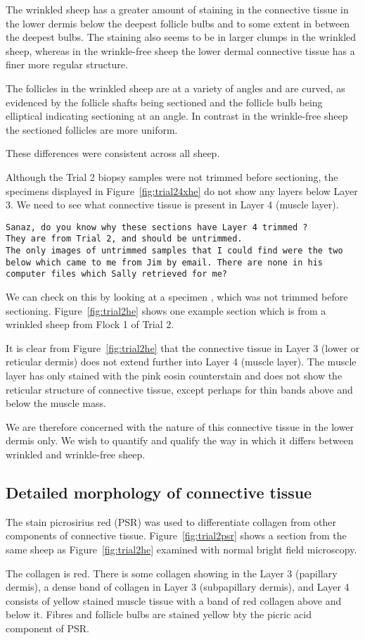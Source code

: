 \documentclass[titlepage]{article}  %
\begin{document}
The wrinkled sheep has a greater amount of staining in the  connective tissue in the lower dermis below the deepest follicle bulbs and to some extent in between the deepest bulbs. The staining also seems to be in larger clumps in the wrinkled sheep, whereas in the wrinkle-free sheep the lower dermal connective tissue has a finer more regular structure. 

  The follicles in the wrinkled sheep are at a variety of angles and are curved, as evidenced by the follicle shafts being sectioned and the follicle bulb being elliptical indicating sectioning at an angle. In contrast in the wrinkle-free sheep the sectioned follicles are more uniform. 

These differences were consistent across all sheep.

Although the Trial 2 biopsy samples were not trimmed before sectioning, the specimens displayed in Figure~\ref{fig:trial24xhe} do not show any layers below Layer 3. We need to see what connective tissue is present in Layer 4 (muscle layer). 
\begin{verbatim}
Sanaz, do you know why these sections have Layer 4 trimmed ? 
They are from Trial 2, and should be untrimmed.
The only images of untrimmed samples that I could find were the two below which came to me from Jim by email. There are none in his computer files which Sally retrieved for me?
\end{verbatim}

  We can check on this by looking at a specimen , which was not trimmed before sectioning. Figure~\ref{fig:trial2he} shows one example section which is from a wrinkled sheep from Flock 1 of Trial 2.


It is clear from Figure~\ref{fig:trial2he} that the connective tissue in Layer 3 (lower or reticular dermis) does not extend further into Layer 4 (muscle layer). The muscle layer has only stained with the pink eosin counterstain and does not show the reticular structure of  connective tissue, except perhaps for  thin bands above and below the muscle mass. 

We are therefore concerned with the nature of this connective tissue in the lower dermis only. We wish to quantify and qualify the way in which it differs between wrinkled and wrinkle-free sheep.

\subsection{Detailed morphology of connective tissue} 
The stain picrosirius red (PSR) was used to differentiate collagen from other components of connective tissue. Figure~\ref{fig:trial2psr} shows a section from the same sheep as Figure~\ref{fig:trial2he} examined with normal bright field microscopy. 

The collagen is red. There is some collagen showing in the Layer 3 (papillary dermis), a dense band of collagen in Layer 3 (subpapillary dermis), and Layer 4 consists of yellow stained muscle tissue with a band of red collagen above and below it.  Fibres and follicle bulbs are stained yellow bty the picric acid component of PSR.
\end{document}
